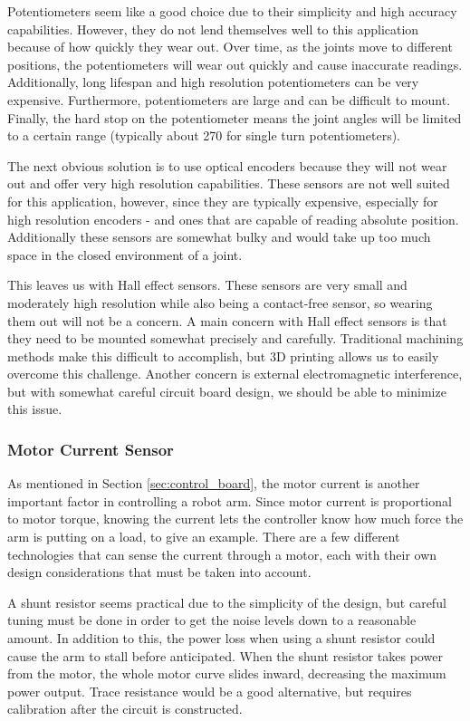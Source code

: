 \noindent Potentiometers seem like a good choice due to their simplicity and high accuracy capabilities. However, they do not lend themselves well to this application because of how quickly they wear out. Over time, as the joints move to different positions, the potentiometers will wear out quickly and cause inaccurate readings. Additionally, long lifespan and high resolution potentiometers can be very expensive. Furthermore, potentiometers are large and can be difficult to mount. Finally, the hard stop on the potentiometer means the joint angles will be limited to a certain range (typically about 270 \textdegree for single turn potentiometers).

\noindent The next obvious solution is to use optical encoders because they will not wear out and offer very high resolution capabilities. These sensors are not well suited for this application, however, since they are typically expensive, especially for high resolution encoders - and ones that are capable of reading absolute position. Additionally these sensors are somewhat bulky and would take up too much space in the closed environment of a joint. 

\noindent This leaves us with Hall effect sensors. These sensors are very small and moderately high resolution while also being a contact-free sensor, so wearing them out will not be a concern. A main concern with Hall effect sensors is that they need to be mounted somewhat precisely and carefully. Traditional machining methods make this difficult to accomplish, but 3D printing allows us to easily overcome this challenge.  Another concern is external electromagnetic interference, but with somewhat careful circuit board design, we should be able to minimize this issue.

\subsubsection{Motor Current Sensor}
As mentioned in Section \ref{sec:control_board}, the motor current is another important factor in controlling a robot arm. Since motor current is proportional to motor torque, knowing the current lets the controller know how much force the arm is putting on a load, to give an example. There are a few different technologies that can sense the current through a motor, each with their own design considerations that must be taken into account.

\noindent A shunt resistor seems practical due to the simplicity of the design, but careful tuning must be done in order to get the noise levels down to a reasonable amount. In addition to this, the power loss when using a shunt resistor could cause the arm to stall before anticipated. When the shunt resistor takes power from the motor, the whole motor curve slides inward, decreasing the maximum power output. Trace resistance would be a good alternative, but requires calibration after the circuit is constructed. 

